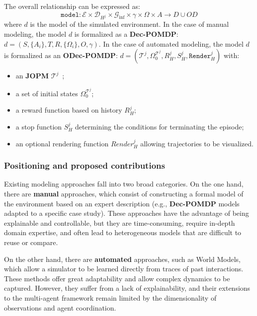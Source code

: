 \documentclass[pdflatex,sn-mathphys-num]{sn-jnl}%
\theoremstyle{thmstyleone}%
\theoremstyle{thmstyletwo}%
\theoremstyle{thmstylethree}%
\begin{document}
The overall relationship can be expressed as:
\begin{displaymath}
    \texttt{model}: \mathcal{E} \times \mathcal{D}_{H^j} \times \mathcal{G}_{\text{inf}} \times \gamma \times \Omega \times A \rightarrow D \cup OD
\end{displaymath}
%
where $d$ is the model of the simulated environment.
In the case of manual modeling, the model $d$ is formalized as a \textbf{Dec-POMDP}: $d = (S,\{A_i\},T,R,\{\Omega_i\},O,\gamma)$.
%
In the case of automated modeling, the model $d$ is formalized as an \textbf{ODec-POMDP}: $d = (\mathcal{T}^j, \Omega^{\mathcal{T}^j}_0, R^j_H, S^j_H, \texttt{Render}^j_H)$ with:
\begin{itemize}
    \item an \textbf{JOPM} $\mathcal{T}^j$~;
    \item a set of initial states $\Omega^{\mathcal{T}^j}_0$;
    \item a reward function based on history $R^j_H$;
    \item a stop function $S^j_H$ determining the conditions for terminating the episode;
    \item an optional rendering function $Render^j_H$ allowing trajectories to be visualized.
\end{itemize}

\subsubsection*{Positioning and proposed contributions}

Existing modeling approaches fall into two broad categories.
On the one hand, there are \textbf{manual} approaches, which consist of constructing a formal model of the environment based on an expert description (e.g., \textbf{Dec-POMDP} models adapted to a specific case study). These approaches have the advantage of being explainable and controllable, but they are time-consuming, require in-depth domain expertise, and often lead to heterogeneous models that are difficult to reuse or compare.

On the other hand, there are \textbf{automated} approaches, such as World Models, which allow a simulator to be learned directly from traces of past interactions. These methods offer great adaptability and allow complex dynamics to be captured. However, they suffer from a lack of explainability, and their extensions to the multi-agent framework remain limited by the dimensionality of observations and agent coordination.
\end{document}
